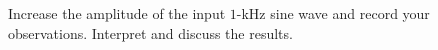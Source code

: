 \documentclass[11pt]{article}
\begin{document}
\begin{question}
    \begin{subquestion}{Increase the amplitude of the input $1$-kHz sine wave and record your observations. Interpret and discuss the results.}
    \end{subquestion}


\end{question}
\end{document}
